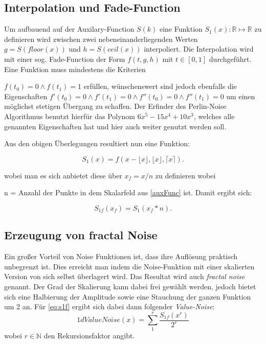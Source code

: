 \subsection{Interpolation und Fade-Function}
Um aufbauend auf der Auxilary-Function $S(k)$ eine Funktion $S_1(x): \mathbb{R}\mapsto\mathbb{R}$ zu definieren wird zwischen zwei nebeneinanderliegenden Werten $g=S(floor(x))$ und $h=S(ceil(x))$ interpoliert. Die Interpolation wird mit einer sog. Fade-Function\cite{fadeFunction} der Form $f(t, g, h)$ mit $t\in[0, 1]$ durchgeführt. Eine Funktion muss mindestens die Kriterien

$f(t_0)=0 \land f(t_1)=1$ 
erfüllen, wünschenswert sind jedoch ebenfalls die Eigenschaften
$f'(t_0)=0 \land f'(t_1)=0 \land f''(t_0)=0 \land f''(t_1)=0$ um einen möglichst stetigen Übergang zu schaffen.
Der Erfinder des Perlin-Noise Algorithmus benutzt hierfür das Polynom $6x^5-15x^4+10x^3$\cite{BurgerGradientNoise2008}, welches alle genannten Eigenschaften hat und hier auch weiter genutzt werden soll.

Aus den obigen Überlegungen resultiert nun eine Funktion:

\begin{equation}\label{s1}
	S_1(x) = f(x-\lfloor{x}\rfloor, \lfloor{x}\rfloor, \lceil{x}\rceil).
\end{equation}

wobei man es sich anbietet diese über $x_f = x / n$ zu definieren wobei 

n = Anzahl der Punkte in dem Skalarfeld aus \ref{auxFunc} ist. 
Damit ergibt sich:

\begin{equation}\label{eq:s1f}
	S_{1f}(x_f) = S_1(x_f * n).
\end{equation}

\subsection{Erzeugung von fractal Noise}
Ein großer Vorteil von Noise Funktionen ist, dass ihre Auflösung praktisch unbegrenzt ist. 
Dies erreicht man indem die Noise-Funktion mit einer skalierten Version von sich selbst überlagert wird. Das Resultat wird auch \emph{fractal noise} genannt.
Der Grad der Skalierung kann dabei frei gewählt werden, jedoch bietet sich eine Halbierung der Amplitude sowie eine Stauchung der ganzen Funktion um 2 an.
Für \ref{eq:s1f} ergibt sich dabei dann folgender \emph{Value-Noise}:
\begin{equation}\label{1dvaluenoise}
	1dValueNoise(x)=\sum_{1}^{r} \frac{S_{1f}(x^r)}{2^r}
\end{equation}
wobei $r \in \mathbb{N}$ den Rekursionsfaktor angibt.






